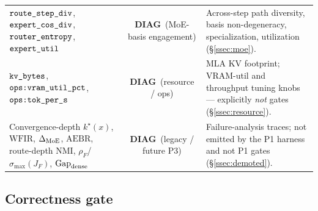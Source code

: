 \documentclass[11pt]{article}
\newcommand{\code}[1]{\texttt{#1}}
\newcommand{\DIAG}{\textcolor{diag}{\textbf{DIAG}}}
\begin{document}
\begin{center}
\begin{tabularx}{\textwidth}{@{}L{0.27\textwidth} c L{0.50\textwidth}@{}}
\(\code{\detokenize{route_step_div}}\), \(\code{\detokenize{expert_cos_div}}\), \(\code{\detokenize{router_entropy}}\), \(\code{\detokenize{expert_util}}\) & \DIAG\ (MoE-basis engagement) & Across-step path diversity, basis non-degeneracy, specialization, utilization (\S\ref{ssec:moe}). \\
\(\code{\detokenize{kv_bytes}}\), \(\code{\detokenize{ops:vram_util_pct}}\), \(\code{\detokenize{ops:tok_per_s}}\) & \DIAG\ (resource / ops) & MLA KV footprint; VRAM-util and throughput tuning knobs --- explicitly \emph{not} gates (\S\ref{ssec:resource}). \\
Convergence-depth \(k^\star(x)\), \(\mathrm{WFIR}\), \(\Delta_{\rm MoE}\), \(\mathrm{AEBR}\), route-depth NMI, \(\rho_F\)/\(\sigma_{\max}(J_F)\), \(\mathrm{Gap}_{\rm dense}\) & \DIAG\ (legacy / future P3) & Failure-analysis traces; not emitted by the P1 harness and not P1 gates (\S\ref{ssec:demoted}). \\
\bottomrule
\end{tabularx}
\end{center}

\subsection{Correctness gate}
\label{ssec:correctness}
\end{document}
